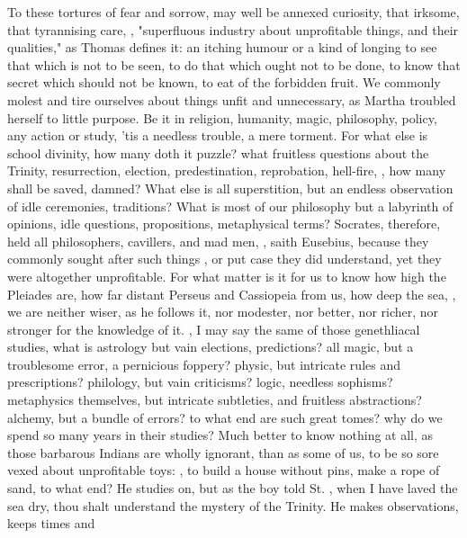 To these tortures of fear and sorrow, may well be annexed curiosity, that
irksome, that tyrannising care, ,
"superfluous industry about unprofitable things, and their
qualities," as Thomas defines it: an itching humour or a kind of longing to see
that which is not to be seen, to do that which ought not to be done, to know
that secret which should not be known, to eat of the
forbidden fruit. We commonly molest and tire ourselves about things unfit and
unnecessary, as Martha troubled herself to little purpose. Be it in religion,
humanity, magic, philosophy, policy, any action or study, 'tis a needless
trouble, a mere torment. For what else is school divinity, how many doth it
puzzle? what fruitless questions about the Trinity, resurrection, election,
predestination, reprobation, hell-fire, \etc{}, how many shall be saved,
damned? What else is all superstition, but an endless observation of idle
ceremonies, traditions? What is most of our philosophy but a labyrinth of
opinions, idle questions, propositions, metaphysical terms? Socrates,
therefore, held all philosophers, cavillers, and mad men, , saith
Eusebius, because they commonly sought after such things
, or put case they did
understand, yet they were altogether unprofitable. For what matter is it for us
to know how high the Pleiades are, how far distant Perseus and Cassiopeia from
us, how deep the sea, \etc{}, we are neither wiser, as he follows it, nor
modester, nor better, nor richer, nor stronger for the knowledge of it.
, I may say the same of those genethliacal
studies, what is astrology but vain elections, predictions? all magic, but a
troublesome error, a pernicious foppery? physic, but intricate rules and
prescriptions? philology, but vain criticisms? logic, needless sophisms?
metaphysics themselves, but intricate subtleties, and fruitless abstractions?
alchemy, but a bundle of errors? to what end are such great tomes? why do we
spend so many years in their studies? Much better to know nothing at all, as
those barbarous Indians are wholly ignorant, than as some of us, to be so sore
vexed about unprofitable toys: , to build a
house without pins, make a rope of sand, to what end?  He studies
on, but as the boy told St. \Austin{}, when I have laved the sea dry, thou shalt
understand the mystery of the Trinity. He makes observations, keeps times and
